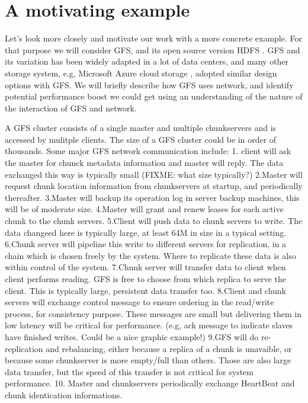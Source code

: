 \section{A motivating example}
\label{section:motivation}

Let's look more closely and motivate our work with a more concrete example. For that purpose we will consider GFS, and its open source version HDFS \cite{hdfs}. GFS and its variation has been widely adapted in a lot of data centers, and many other storage system, e.g, Microsoft Azure cloud storage \cite{azure-storage}, adopted similar design options with GFS. We will briefly describe how GFS uses network, and identify potential performance boost we could get using an understanding of the nature of the interaction of GFS and network.

A GFS cluster consists of a single master and multiple chunkservers and is accessed by mulitple clients. The size of a GFS cluster could be in order of thousands. Some major GFS network communication include:
1. client will ask the master for chunck metadata information and master will reply. The data exchanged this way is typically small (FIXME: what size typically?)
2.Master will request chunk location information from chunkservers at startup, and periodically thereafter.
3.Master will backup its operation log in server backup machines, this will be of moderate size.
4.Master will grant and renew leases for each active chunk to the chunk servers.
5.Client will push data to chunk servers to write. The data changeed here is typically large, at least 64M in size in a typical setting.
6.Chunk server will pipeline this write to different servers for replication, in a chain which is chosen freely by the system. Where to replicate these data is also within control of the system.
7.Chunk server will transfer data to client when client performs reading. GFS is free to choose from which replica to serve the client. This is typically large, persistent data transfer too.
8.Client and chunk servers will exchange control message to ensure ordering in the read/write process, for consistency purpose. These messages are small but delivering them in low latency will be critical for performance. (e.g, ack message to indicate slaves have finished writes. Could be a nice graphic example!)
9.GFS will do re-replication and rebalancing, either because a replica of a chunk is unavaible, or because some chunkserver is more empty/full than others. Those are also large data transfer, but the speed of this transfer is not critical for system performance.
10. Master and chunkservers periodically exchange HeartBeat and chunk identication informations.

